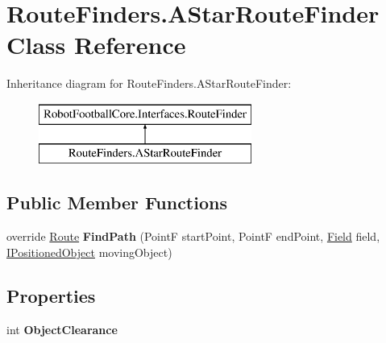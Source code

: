 \hypertarget{class_route_finders_1_1_a_star_route_finder}{\section{Route\-Finders.\-A\-Star\-Route\-Finder Class Reference}
\label{class_route_finders_1_1_a_star_route_finder}
}
Inheritance diagram for Route\-Finders.\-A\-Star\-Route\-Finder\-:\begin{figure}[H]
\begin{center}
\leavevmode
\includegraphics[height=2.000000cm]{class_route_finders_1_1_a_star_route_finder}
\end{center}
\end{figure}
\subsection*{Public Member Functions}
\begin{DoxyCompactItemize}
\item 
\hypertarget{class_route_finders_1_1_a_star_route_finder_a229b504b78acad5349863965321d919f}{override \hyperlink{class_robot_football_core_1_1_route_objects_1_1_route}{Route} {\bfseries Find\-Path} (Point\-F start\-Point, Point\-F end\-Point, \hyperlink{class_robot_football_core_1_1_objects_1_1_field}{Field} field, \hyperlink{interface_robot_football_core_1_1_interfaces_1_1_i_positioned_object}{I\-Positioned\-Object} moving\-Object)}\label{class_route_finders_1_1_a_star_route_finder_a229b504b78acad5349863965321d919f}

\end{DoxyCompactItemize}
\subsection*{Properties}
\begin{DoxyCompactItemize}
\item 
\hypertarget{class_route_finders_1_1_a_star_route_finder_a943607da25dc73066ed4d769acb3c60c}{int {\bfseries Object\-Clearance}}\label{class_route_finders_1_1_a_star_route_finder_a943607da25dc73066ed4d769acb3c60c}

\end{DoxyCompactItemize}
